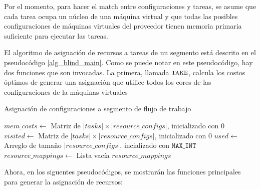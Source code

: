 Por el momento, para hacer el match entre configuraciones y tareas, se asume que cada tarea ocupa un núcleo de una máquina virtual y que todas las posibles configuraciones de máquinas virtuales del proveedor tienen memoria primaria suficiente para ejecutar las tareas.

El algoritmo de asignación de recursos a tareas de un segmento está descrito en el pseudocódigo \ref{alg_blind_main}. Como se puede notar en este pseudocódigo, hay dos funciones que son invocadas. La primera, llamada $\Call{take}{}$, calcula los costos óptimos de generar una asignación que utilice todos los cores de las configuraciones de la máquinas virtuales

\begin{algorithm}
\caption{Asignación de configuraciones a segmento de flujo de trabajo}
\label{alg_blind_main}
\begin{algorithmic}[1]

	\State $mem\_costs \gets$ Matriz de $|tasks| \times |resource\_configs|$, inicializado con 0 
	\State $visited \gets$ Matriz de $|tasks| \times |resource\_configs|$, inicializado con 0
	\State $used \gets$ Arreglo de tamaño $|resource\_configs|$, incializado con $\texttt{MAX\_INT}$
	\State $resource\_mappings \gets$ Lista vacía
	\State {}
	\State {}
	\State \Return $resource\_mappings$
\EndProcedure
\end{algorithmic}
\end{algorithm}


Ahora, en los siguentes pseudocódigos, se mostrarán las funciones principales para generar la asignación de recursos:

